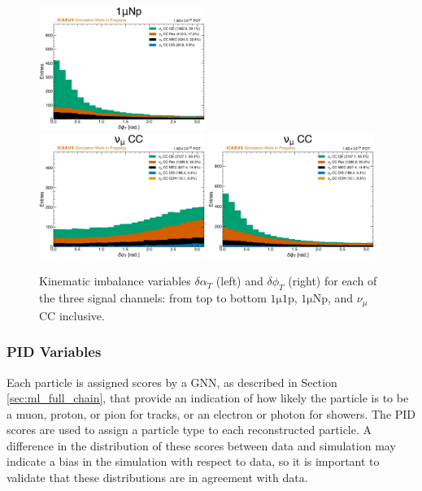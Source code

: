 \begin{figure}[!htb]
    \includegraphics[width=0.48\textwidth]{figures/neutrino_selection/signal_hist1d_1muNp_delta_phiT.pdf}
    \\
    \includegraphics[width=0.48\textwidth]{figures/neutrino_selection/signal_hist1d_1muX_delta_alphaT.pdf}
    \includegraphics[width=0.48\textwidth]{figures/neutrino_selection/signal_hist1d_1muX_delta_phiT.pdf}
    \caption{Kinematic imbalance variables $\delta \alpha_T$ (left) and $\delta \phi_T$ (right) for each of the three signal channels: from top to bottom $\mathrm{1\mu 1p}$, $\mathrm{1\mu Np}$, and $\nu_\mu$ CC inclusive.}
    \label{fig:kinematic_imbalance_angles}
\end{figure}

\subsubsection{PID Variables}
\label{sec:pid_variables}

Each particle is assigned scores by a GNN, as described in Section \ref{sec:ml_full_chain}, that provide an indication of how likely the particle is to be a muon, proton, or pion for tracks, or an electron or photon for showers. The PID scores are used to assign a particle type to each reconstructed particle. A difference in the distribution of these scores between data and simulation may indicate a bias in the simulation with respect to data, so it is important to validate that these distributions are in agreement with data.

